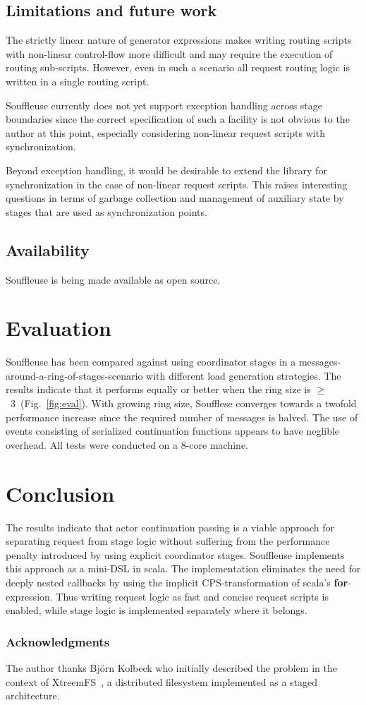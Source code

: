 \documentclass[preprint]{sigplanconf}
\begin{document}
\subsection{Limitations and future work}

The strictly linear nature of generator expressions makes writing routing scripts with
non-linear control-flow more difficult and may require the execution of routing sub-scripts.  
However, even in such a scenario all request routing logic is written in a single routing
script.

Souffleuse currently does not yet support exception handling across stage boundaries since the
correct specification of such a facility is not obvious to the author at this point, especially
considering non-linear request scripts with synchronization.

Beyond exception handling, it would be desirable to extend the library for synchronization in the
case of non-linear request scripts. This raises interesting questions in terms of garbage collection
and management of auxiliary state by stages that are used as synchronization points.
                                      
  
\subsection{Availability}

Souffleuse is being made available as open source.


\section{Evaluation}
     
Souffleuse has been compared against using coordinator stages in a
messages-around-a-ring-of-stages-scenario with different load generation strategies. The results
indicate that it performs equally or better when the ring size is $\ge$~3~(Fig.~\ref{fig:eval}).
With growing ring size, Soufflese converges towards a twofold performance increase since the
required number of messages is halved. The use of events consisting of serialized continuation
functions appears to have neglible overhead. All tests were conducted on a 8-core machine.


\section{Conclusion}

The results indicate that actor continuation passing is a viable approach for separating request
from stage logic without suffering from the performance penalty introduced by using explicit
coordinator stages. Souffleuse implements this approach as a mini-DSL in scala. The implementation
eliminates the need for deeply nested callbacks by using the implicit CPS-transformation of scala's
\textbf{for}-expression. Thus writing request logic as fast and concise request scripts is enabled,
while stage logic is implemented separately where it belongs.

\subsubsection*{Acknowledgments}

The author thanks Bj\"orn Kolbeck who initially described the problem in the context of
XtreemFS~\cite{Hupfeld:2007}, a distributed filesystem implemented as a staged architecture.

 

\end{document}
